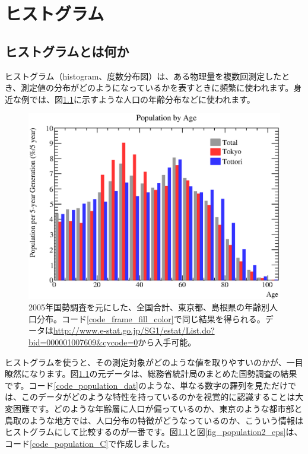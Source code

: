\chapter{ヒストグラム}
\label{chap_Histogram}

\section{ヒストグラムとは何か}
ヒストグラム（histogram、度数分布図）は、ある物理量を複数回測定したとき、測定値の分布がどのようになっているかを表すときに頻繁に使われます。身近な例では、図\ref{fig_population_eps}に示すような人口の年齢分布などに使われます。

\begin{figure}
  \begin{center}
    \includegraphics[width=12cm,clip]{fig/population.eps}
    \caption{2005年国勢調査を元にした、全国合計、東京都、島根県の年齢別人口分布。コード\ref{code_frame_fill_color}で同じ結果を得られる。データは\url{http://www.e-stat.go.jp/SG1/estat/List.do?bid=000001007609&cycode=0}から入手可能。}
    \label{fig_population_eps}
  \end{center}
\end{figure}

ヒストグラムを使うと、その測定対象がどのような値を取りやすいのかが、一目瞭然になります。図\ref{fig_population_eps}の元データは、総務省統計局のまとめた国勢調査の結果です。コード\ref{code_population_dat}のような、単なる数字の羅列を見ただけでは、このデータがどのような特性を持っているのかを視覚的に認識することは大変困難です。どのような年齢層に人口が偏っているのか、東京のような都市部と鳥取のような地方では、人口分布の特徴がどうなっているのか、こういう情報はヒストグラムにして比較するのが一番です。図\ref{fig_population_eps}と図\ref{fig_population2_eps}は、コード\ref{code_population_C}で作成しました。

